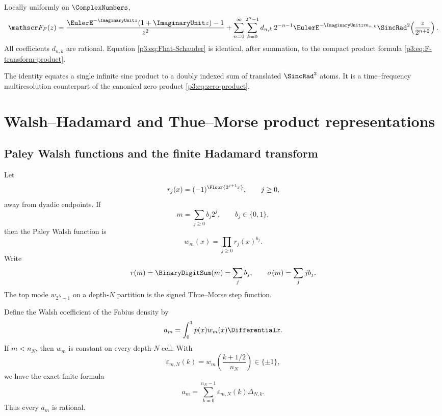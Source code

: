 \documentclass[11pt]{article}
\theoremstyle{definition}
\theoremstyle{remark}
\begin{document}
\begin{corollary}
\label{p3:cor:Fhat-Schauder}
Locally uniformly on $\ComplexNumbers$,
\begin{equation}\label{p3:eq:Fhat-Schauder}
 \mathscr F_F(z)
 =\frac{\EulerE^{-\ImaginaryUnit z}(1+\ImaginaryUnit z)-1}{z^2}
 +\sum_{n=0}^\infty\sum_{k=0}^{2^n-1}
 d_{n,k}\,2^{-n-1}\EulerE^{-\ImaginaryUnit z m_{n,k}}
 \SincRad^2\!\left(\frac{z}{2^{n+2}}\right).
\end{equation}
All coefficients $d_{n,k}$ are rational.  Equation
\eqref{p3:eq:Fhat-Schauder} is identical, after summation, to the compact product
formula \eqref{p3:eq:F-transform-product}.
\end{corollary}

The identity equates a single infinite sinc product to a doubly indexed sum of
translated $\SincRad^2$ atoms.  It is a time--frequency multiresolution counterpart
of the canonical zero product \eqref{p3:eq:zero-product}.

\section{Walsh--Hadamard and Thue--Morse product representations}
\label{p3:sec:walsh}

\subsection{Paley Walsh functions and the finite Hadamard transform}

Let
\begin{equation}\label{p3:eq:Rademacher}
 r_j(x)=(-1)^{\Floor{2^{j+1}x}},
 \qquad j\ge0,
\end{equation}
away from dyadic endpoints.  If
\begin{equation}\label{p3:eq:m-bits}
 m=\sum_{j\ge0}b_j2^j,
 \qquad b_j\in\{0,1\},
\end{equation}
then the Paley Walsh function is
\begin{equation}\label{p3:eq:Walsh-def}
 w_m(x)=\prod_{j\ge0}r_j(x)^{b_j}.
\end{equation}
Write
\begin{equation}\label{p3:eq:weight-sigma}
 r(m)=\BinaryDigitSum(m)=\sum_jb_j,
 \qquad
 \sigma(m)=\sum_jj b_j.
\end{equation}
The top mode $w_{2^N-1}$ on a depth-$N$ partition is the signed
Thue--Morse step function.

Define the Walsh coefficient of the Fabius density by
\begin{equation}\label{p3:eq:a_m-def}
 a_m=\int_0^1p(x)w_m(x)\Differential x.
\end{equation}
If $m<n_N$, then $w_m$ is constant on every depth-$N$ cell.  With
\begin{equation}\label{p3:eq:epsilon-mNk}
 \varepsilon_{m,N}(k)=w_m\!\left(\frac{k+1/2}{n_N}\right)\in\{\pm1\},
\end{equation}
we have the exact finite formula
\begin{equation}\label{p3:eq:a-Hadamard-masses}
 a_m=\sum_{k=0}^{n_N-1}\varepsilon_{m,N}(k)\Delta_{N,k}.
\end{equation}
Thus every $a_m$ is rational.
\end{document}
